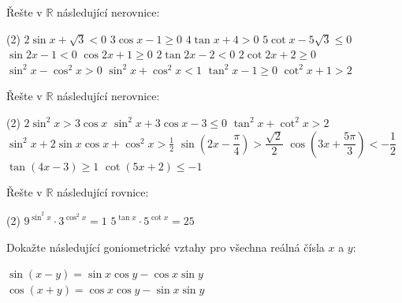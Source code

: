 \documentclass[12pt,a4paper]{article}
\begin{document}
\begin{exercise}
    Řešte v $\mathbb{R}$ následující nerovnice:
    \begin{tasks}(2)
        \task $2 \sin x + \sqrt{3} < 0$
        \task $3 \cos x - 1 \ge 0$
        \task $4 \tan x + 4 > 0$
        \task $5 \cot x - 5\sqrt{3} \le 0$
        \task $\sin 2x - 1 < 0$
        \task $\cos 2x + 1 \ge 0$
        \task $2 \tan 2x - 2 < 0$
        \task $2 \cot 2x + 2 \ge 0$
        \task $\sin^2 x - \cos^2 x > 0$
        \task $\sin^2 x + \cos^2 x < 1$
        \task $\tan^2 x - 1 \ge 0$
        \task $\cot^2 x + 1 > 2$
    \end{tasks}
\end{exercise}


\begin{exercise}
    Řešte v $\mathbb{R}$ následující nerovnice:
    \begin{tasks}(2)
        \task $2 \sin^2 x > 3 \cos x$
        \task $\sin^2 x + 3 \cos x - 3 \le 0$
        \task $\tan^2 x + \cot^2 x > 2$
        \task $\sin^2 x + 2 \sin x \cos x + \cos^2 x > \frac{1}{2}$
        \task $\sin \left(2x - \dfrac{\pi}{4}\right) > \dfrac{\sqrt{2}}{2}$
        \task $\cos \left(3x + \dfrac{5\pi}{3}\right) < -\dfrac{1}{2}$
        \task $\tan \left(4x - 3\right) \ge 1$
        \task $\cot \left(5x + 2\right) \le -1$
    \end{tasks}
\end{exercise}



\begin{exercise}
    Řešte v $\mathbb{R}$ následující rovnice:
    \begin{tasks}(2)
        \task $9^{\sin^2 x} \cdot 3^{\cos^2 x} = 1$
        \task $5^{\tan x} \cdot 5^{\cot x} = 25$

    \end{tasks}
    
\end{exercise}


\begin{exercise}
    Dokažte následující goniometrické vztahy pro všechna reálná čísla $x$ a $y$:
    \begin{tasks}
        \task $\sin (x - y) = \sin x \cos y - \cos x \sin y$
        \task $\cos (x + y) = \cos x \cos y - \sin x \sin y$
    \end{tasks}
\end{exercise}
\end{document}
